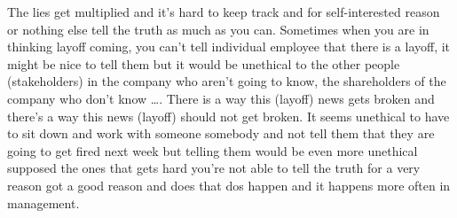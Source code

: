 \documentclass[a4paper, 12pt]{article}
\begin{document}
\begin{flushleft}
The lies get multiplied and it's hard to keep track and for self-interested reason or nothing else tell the truth as much as you can. Sometimes when you are in thinking  layoff coming, you can't tell individual employee that there is a layoff, it  might be nice to tell them but it would be unethical to the other people (stakeholders) in the company who aren't going to know, the shareholders of the company who don't know \ldots . There is a way this (layoff) news gets broken and there's a way this news (layoff) should not get broken. It seems unethical to have to sit down and work with someone somebody and not tell them that they are going to get fired next week but telling them would be even more unethical supposed the ones that gets hard you're not able to tell the truth for a very reason got a good reason and does that dos happen and it happens more often in management. \\~\\


\end{flushleft}
\end{document}
